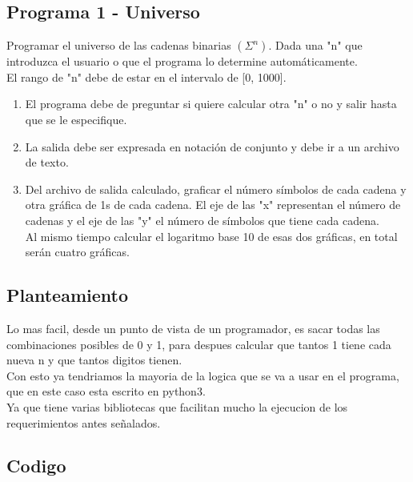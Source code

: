 \documentclass{article}
\begin{document}
\subsection{Programa 1 - Universo}
Programar el universo de las cadenas binarias $(\Sigma^n)$. Dada una "n" que introduzca el usuario o que el programa lo determine automáticamente.
\\El rango de "n" debe de estar en el intervalo de [0, 1000].
\begin{enumerate}
    \item El programa debe de preguntar si quiere calcular otra "n" o no y salir hasta que se le especifique.
    \item La salida debe ser expresada en notación de conjunto y debe ir a un archivo de texto.
    \item Del archivo de salida calculado, graficar el número símbolos de cada cadena y otra gráfica de 1s de cada cadena. El eje de las "x" representan el número de cadenas y el eje de las "y" el número de símbolos que tiene cada cadena. 
    \\Al mismo tiempo calcular el logaritmo base 10 de esas dos gráficas, en total serán cuatro gráficas.
\end{enumerate} 

\subsection{Planteamiento}
Lo mas facil, desde un punto de vista de un programador, es sacar todas las combinaciones posibles de 0 y 1, para despues calcular que tantos 1 tiene cada nueva n y que tantos digitos tienen.
\\Con esto ya tendriamos la mayoria de la logica que se va a usar en el programa, que en este caso esta escrito en python3. 
\\Ya que tiene varias bibliotecas que facilitan mucho la ejecucion de los requerimientos antes señalados.

\subsection{Codigo}
\end{document}

